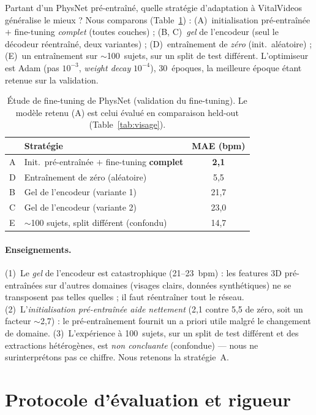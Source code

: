 \documentclass[11pt]{article}
\begin{document}
Partant d'un PhysNet pré-entraîné, quelle stratégie d'adaptation à VitalVideos
généralise le mieux ? Nous comparons (Table~\ref{tab:ft}) : (A)~initialisation
pré-entraînée $+$ fine-tuning \emph{complet} (toutes couches) ; (B, C)~\emph{gel} de
l'encodeur (seul le décodeur réentraîné, deux variantes) ; (D)~entraînement de
\emph{zéro} (init.\ aléatoire) ; (E)~un entraînement sur $\sim$100~sujets, sur un
split de test différent. L'optimiseur est Adam (pas $10^{-3}$, \emph{weight decay}
$10^{-4}$), 30~époques, la meilleure époque étant retenue sur la validation.

\begin{table}[h]
\centering
\caption{Étude de fine-tuning de PhysNet (validation du fine-tuning). Le modèle
retenu (A) est celui évalué en comparaison held-out (Table~\ref{tab:visage}).}
\label{tab:ft}
\begin{tabular}{llc}
\toprule
 & Stratégie & MAE (bpm) \\
\midrule
A & Init.\ pré-entraînée $+$ fine-tuning \textbf{complet} & \textbf{2{,}1} \\
D & Entraînement de zéro (aléatoire) & 5{,}5 \\
B & Gel de l'encodeur (variante 1) & 21{,}7 \\
C & Gel de l'encodeur (variante 2) & 23{,}0 \\
E & $\sim$100 sujets, split différent (confondu) & 14{,}7 \\
\bottomrule
\end{tabular}
\end{table}

\paragraph{Enseignements.} (1)~Le \emph{gel} de l'encodeur est catastrophique
(21--23~bpm) : les features 3D pré-entraînées sur d'autres domaines (visages clairs,
données synthétiques) ne se transposent pas telles quelles ; il faut réentraîner tout
le réseau. (2)~L'\emph{initialisation pré-entraînée aide nettement} (2{,}1 contre
5{,}5 de zéro, soit un facteur $\sim$2{,}7) : le pré-entraînement fournit un a priori
utile malgré le changement de domaine. (3)~L'expérience à 100~sujets, sur un split de
test différent et des extractions hétérogènes, est \emph{non concluante} (confondue)
--- nous ne surinterprétons pas ce chiffre. Nous retenons la stratégie~A.

\section{Protocole d'évaluation et rigueur}
\label{sec:rigueur}
\end{document}
